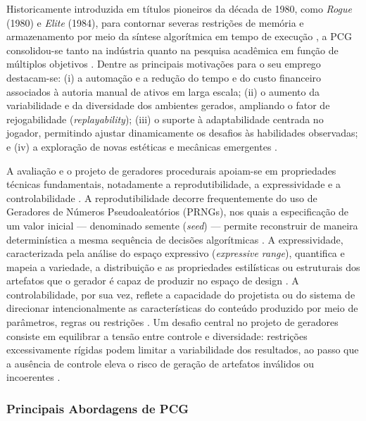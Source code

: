 Historicamente introduzida em títulos pioneiros da década de 1980, como \textit{Rogue} (1980) e \textit{Elite} (1984), para contornar severas restrições de memória e armazenamento por meio da síntese algorítmica em tempo de execução \cite{pcgbook, summerville2018procedural, araujo2018geracao}, a PCG consolidou-se tanto na indústria quanto na pesquisa acadêmica em função de múltiplos objetivos \cite{linden2014dungeons, pcgbook}. Dentre as principais motivações para o seu emprego destacam-se: (i) a automação e a redução do tempo e do custo financeiro associados à autoria manual de ativos em larga escala; (ii) o aumento da variabilidade e da diversidade dos ambientes gerados, ampliando o fator de rejogabilidade (\textit{replayability}); (iii) o suporte à adaptabilidade centrada no jogador, permitindo ajustar dinamicamente os desafios às habilidades observadas; e (iv) a exploração de novas estéticas e mecânicas emergentes \cite{linden2014dungeons, pcgbook, summerville2018procedural}.

A avaliação e o projeto de geradores procedurais apoiam-se em propriedades técnicas fundamentais, notadamente a reprodutibilidade, a expressividade e a controlabilidade \cite{tanagra, smith2010analyzing, linden2014dungeons, maleki2024procedural}. A reprodutibilidade decorre frequentemente do uso de Geradores de Números Pseudoaleatórios (PRNGs), nos quais a especificação de um valor inicial --- denominado semente (\textit{seed}) --- permite reconstruir de maneira determinística a mesma sequência de decisões algorítmicas \cite{maleki2024procedural}. A expressividade, caracterizada pela análise do espaço expressivo (\textit{expressive range}), quantifica e mapeia a variedade, a distribuição e as propriedades estilísticas ou estruturais dos artefatos que o gerador é capaz de produzir no espaço de design \cite{smith2010analyzing, linden2013designing}. A controlabilidade, por sua vez, reflete a capacidade do projetista ou do sistema de direcionar intencionalmente as características do conteúdo produzido por meio de parâmetros, regras ou restrições \cite{linden2014dungeons, shaker2016constructive}. Um desafio central no projeto de geradores consiste em equilibrar a tensão entre controle e diversidade: restrições excessivamente rígidas podem limitar a variabilidade dos resultados, ao passo que a ausência de controle eleva o risco de geração de artefatos inválidos ou incoerentes \cite{smith2010analyzing, linden2014dungeons}.

\subsubsection{Principais Abordagens de PCG}
\label{sec:abordagens_pcg}

